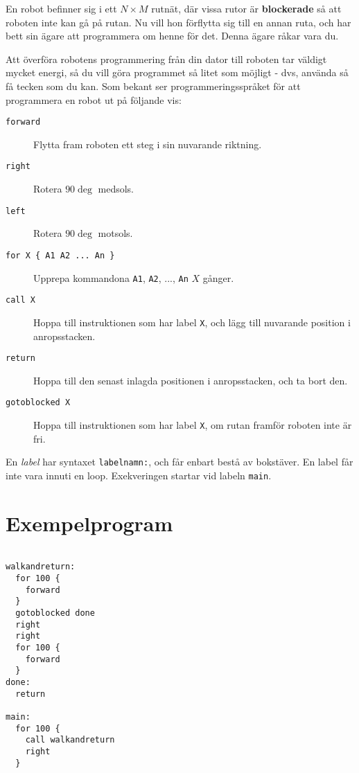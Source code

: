
En robot befinner sig i ett $N \times M$ rutnät, där vissa rutor är \textbf{blockerade} så att roboten inte kan gå på rutan. Nu vill hon förflytta sig till en annan ruta, och har bett sin ägare att programmera om henne för det. Denna ägare råkar vara du.

Att överföra robotens programmering från din dator till roboten tar väldigt mycket energi, så du vill göra programmet så litet som möjligt - dvs, använda så få tecken som du kan.
Som bekant ser programmeringsspråket för att programmera en robot ut på följande vis:

\begin{description}
  \item[\texttt{forward}] Flytta fram roboten ett steg i sin nuvarande riktning.
  \item[\texttt{right}] Rotera $90\deg$ medsols.
  \item[\texttt{left}] Rotera $90\deg$ motsols.
  \item[\texttt{for X \{ A1 A2 ... An \}}] Upprepa kommandona \texttt{A1}, \texttt{A2}, ..., \texttt{An} $X$ gånger.
  \item[\texttt{call X}] Hoppa till instruktionen som har label \texttt{X}, och lägg till nuvarande position i anropsstacken.
  \item[\texttt{return}] Hoppa till den senast inlagda positionen i anropsstacken, och ta bort den.
  \item[\texttt{gotoblocked X}] Hoppa till instruktionen som har label \texttt{X}, om rutan framför roboten inte är fri.
\end{description}

En \emph{label} har syntaxet \texttt{labelnamn:}, och får enbart bestå av bokstäver. En label får inte vara innuti en loop. Exekveringen startar vid labeln \texttt{main}.

\section*{Exempelprogram}

\begin{verbatim}

walkandreturn:
  for 100 {
    forward
  }
  gotoblocked done
  right
  right
  for 100 {
    forward
  }
done:
  return

main:
  for 100 {
    call walkandreturn
    right
  }
\end{verbatim}

